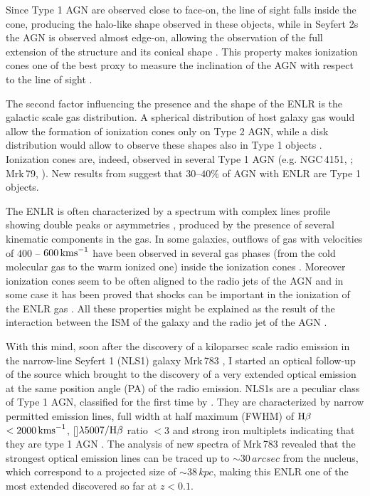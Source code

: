 \documentclass[../main.tex]{subfiles}
\begin{document}
Since Type 1 AGN are observed close to face-on, the line of sight falls inside the cone, producing the halo-like shape observed in these objects, while in Seyfert 2s the AGN is observed almost edge-on, allowing the observation of the full extension of the structure and its conical shape \citep{Schmitt03,Schmitt03b}.
This property makes ionization cones one of the best proxy to measure the inclination of the AGN with respect to the line of sight \citep{Fischer13,Marin14}.

The second factor influencing the presence and the shape of the ENLR is the galactic scale gas distribution. 
A spherical distribution of host galaxy gas would allow the formation of ionization cones only on Type 2 AGN, while a disk distribution would allow to observe these shapes also in Type 1 objects \citep{Mulchaey96b,Schmitt03b}.
Ionization cones are, indeed, observed in several Type 1 AGN (e.g. NGC\,4151, \cite{Pogge88}; Mrk\,79, \cite{Schmitt03}).
New results from \citet{He18} suggest that $30$--$40\%$ of AGN with ENLR are Type 1 objects. 

The ENLR is often characterized by a spectrum with complex lines profile showing double peaks or asymmetries \citep{Dietrich98,Morganti07,Ozaki09,Congiu17b}, produced by the presence of several kinematic components in the gas.
In some galaxies, outflows of gas with velocities of $400$ -- $600\,\si{\kms}$ have been observed in several gas phases (from the cold molecular gas to the warm ionized one) inside the ionization cones \citep[e.g. IC\,5063,][]{Baldwin87,Morganti98,Morganti07,Dasyra15,Morganti15}.
Moreover ionization cones seem to be often aligned to the radio jets of the AGN \citep{Unger87,Nagar99,Schmitt03,Schmitt03b} and in some case it has been proved that shocks can be important in the ionization of the ENLR gas \citep{Congiu17b,Rodriguez17}.
All these properties might be explained as the result of the interaction between the ISM of the galaxy and the radio jet of the AGN \citep[e.g.][]{Unger87,Tadhunter14,Congiu17b,Rodriguez17}.

With this mind, soon after the discovery of a kiloparsec scale radio emission in the narrow-line Seyfert 1 (NLS1) galaxy Mrk\,783 \citep{Congiu17}, I started an optical follow-up of the source which brought to the discovery of a very extended optical emission at the same position angle (PA) of the radio emission. 
NLS1s are a peculiar class of Type 1 AGN, classified for the first time by \citet{Osterbrock85}.
They are characterized by narrow permitted emission lines, full width at half maximum (FWHM) of $\Hb$ $<2000\,\si{\kms}$, []$\lambda5007/\Hb$ ratio $<3$ \citep{Osterbrock85} and strong iron multiplets indicating that they are type 1 AGN \citep{Goodrich89}.
The analysis of new spectra of Mrk\,783 \citep{Congiu17c} revealed that the strongest optical emission lines can be traced up to $\sim 30\,\si{arcsec}$ from the nucleus, which correspond to a projected size of $\sim 38\,\si{kpc}$, making this ENLR one of the most extended discovered so far at $z<0.1$.
\end{document}
